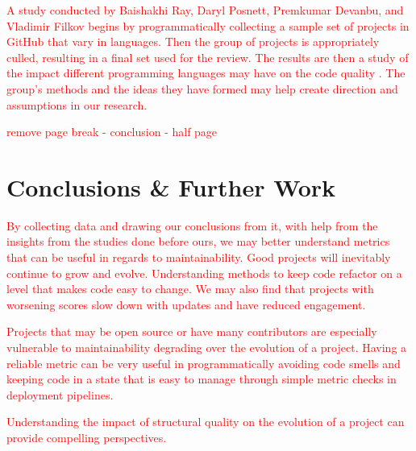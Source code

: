 \documentclass[12pt,conference]{IEEEtran}
\newcommand\todo[1]{\textcolor{red}{#1}}
\begin{document}
\todo{A study conducted by Baishakhi Ray, Daryl Posnett, Premkumar Devanbu, and Vladimir Filkov begins by programmatically collecting a sample set of projects in GitHub that vary in languages. Then the group of projects is appropriately culled, resulting in a final set used for the review. The results are then a study of the impact different programming languages may have on the code quality \cite{baishakhi:2017}. The group's methods and the ideas they have formed may help create direction and assumptions in our research.}

\newpage \todo{remove page break - conclusion - half page}

\section{Conclusions \& Further Work}

\todo{By collecting data and drawing our conclusions from it, with help from the insights from the studies done before ours, we may better understand metrics that can be useful in regards to maintainability. Good projects will inevitably continue to grow and evolve. Understanding methods to keep code refactor on a level that makes code easy to change. We may also find that projects with worsening scores slow down with updates and have reduced engagement.}

\todo{Projects that may be open source or have many contributors are especially vulnerable to maintainability degrading over the evolution of a project. Having a reliable metric can be very useful in programmatically avoiding code smells and keeping code in a state that is easy to manage through simple metric checks in deployment pipelines.}

\todo{Understanding the impact of structural quality on the evolution of a project can provide compelling perspectives.}

\newpage



\end{document}
